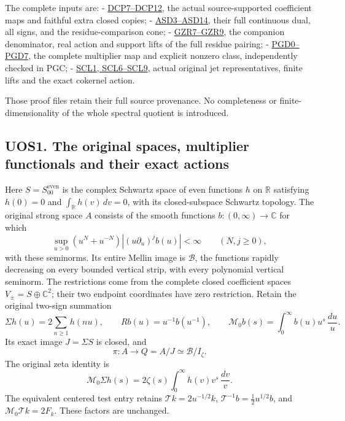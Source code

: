 The complete inputs are: -
\href{SOURCE_CC_DOUBLE_PULLBACK.md}{DCP7--DCP12}, the actual
source-supported coefficient maps and faithful extra closed copies; -
\href{ACTUAL_SUPPORTED_DUALITY_INDEPENDENT.md}{ASD3--ASD14}, their full
continuous dual, all signs, and the residue-comparison cone; -
\href{GLOBAL_ORIGINAL_ZETA_RESIDUE_DUALITY_INDEPENDENT.md}{GZR7--GZR9},
the companion denominator, real action and support lifts of the full
residue pairing; - \href{GLOBAL_POLYNOMIAL_DUAL_DEFECT.md}{PGD0--PGD7},
the complete multiplier map and explicit nonzero class, independently
checked in PGC; -
\href{SPECTRAL_COKERNEL_DIVISIBILITY_AND_FINITE_LIFTING.md}{SCL1,
SCL6--SCL9}, actual original jet representatives, finite lifts and the
exact cokernel action.

Those proof files retain their full source provenance. No completeness
or finite-dimensionality of the whole spectral quotient is introduced.

\subsection{UOS1. The original spaces, multiplier functionals and their
exact
actions}\label{uos1.-the-original-spaces-multiplier-functionals-and-their-exact-actions}

Here \(S=S_{00}^{\mathrm{even}}\) is the complex Schwartz space of even
functions \(h\) on \(\mathbb R\) satisfying \(h(0)=0\) and
\(\int_{\mathbb R}h(v)\,dv=0\), with its closed-subspace Schwartz
topology. The original strong space \(A\) consists of the smooth
functions \(b:(0,\infty)\to\mathbb C\) for which \[
 \sup_{u>0}(u^N+u^{-N})\left|(u\partial_u)^jb(u)\right|<\infty
 \qquad(N,j\ge0),
\] with these seminorms. Its entire Mellin image is \(\mathcal B\), the
functions rapidly decreasing on every bounded vertical strip, with every
polynomial vertical seminorm. The restrictions come from the complete
closed coefficient spaces \(V_\pm=S\oplus\mathbb C^2\); their two
endpoint coordinates have zero restriction. Retain the original two-sign
summation \[
 \Sigma h(u)=2\sum_{n\ge1}h(nu),\qquad
 Rb(u)=u^{-1}b(u^{-1}),\qquad
 \mathcal M_0b(s)=\int_0^\infty b(u)u^s\,\frac{du}{u}.
 \tag{UOS1.1}
\] Its exact image \(J=\Sigma S\) is closed, and \[
 \pi:A\to Q=A/J\simeq\mathcal B/I_\zeta.
\] The original zeta identity is \[
 \mathcal M_0\Sigma h(s)
 =2\zeta(s)\int_0^\infty h(v)v^s\,\frac{dv}{v}.
 \tag{UOS1.2}
\] The equivalent centered test entry retains
\(\mathcal Tk=2u^{-1/2}k\), \(\mathcal T^{-1}b=\frac12u^{1/2}b\), and
\(\mathcal M_0\mathcal Tk=2F_k\). These factors are unchanged.

